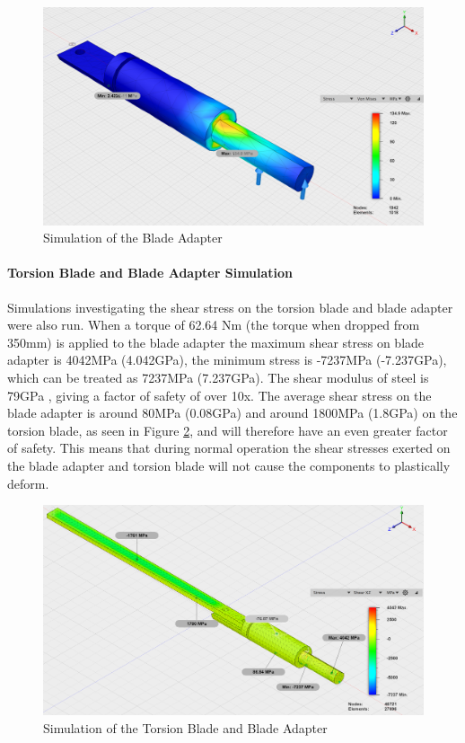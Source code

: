 \begin{figure}[h]
\centering\includegraphics[width=0.6\linewidth]{Images/MaxImages/BladeAdapterSim.png}
\caption{Simulation of the Blade Adapter}
\label{fig:BladeAdapterSim}
\end{figure}

\paragraph{Torsion Blade and Blade Adapter Simulation}

Simulations investigating the shear stress on the torsion blade and  blade adapter were also run. When a torque of 62.64 Nm (the torque when dropped from 350mm) is applied to the blade adapter the maximum shear stress on blade adapter is 4042MPa (4.042GPa), the minimum stress is -7237MPa (-7.237GPa), which can be treated as 7237MPa (7.237GPa). The shear modulus of steel is 79GPa \cite{Crandall78}, giving a factor of safety of over 10x. The average shear stress on the blade adapter is around 80MPa (0.08GPa) and around 1800MPa (1.8GPa) on the torsion blade, as seen in Figure \ref{fig:TorsionBladeandAdapter}, and will therefore have an even greater factor of safety. This means that during normal operation the shear stresses exerted on the blade adapter and torsion blade will not cause the components to plastically deform.

\begin{figure}[h]
\centering\includegraphics[width=0.6\linewidth]{Images/MaxImages/TorsionBladeandAdapter.png}
\caption{Simulation of the Torsion Blade and Blade Adapter}
\label{fig:TorsionBladeandAdapter}
\end{figure}